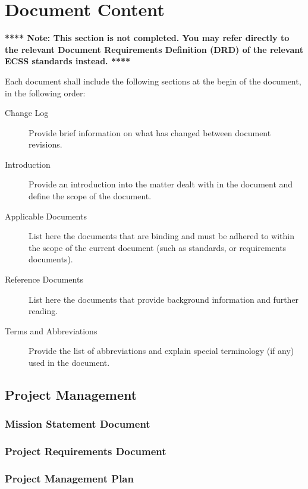 \chapter{Document Content}

\textbf{
****
Note: This section is not completed. You may refer directly to the relevant Document Requirements Definition (DRD) of the relevant ECSS standards instead.
****}


Each document shall include the following sections at the begin of the document, in the following order:

\begin{description}
\item[Change Log]
Provide brief information on what has changed between document revisions.
\item[Introduction]
Provide an introduction into the matter dealt with in the document and define the scope of the document.
\item[Applicable Documents]
List here the documents that are binding and must be adhered to within the scope of the current document (such as standards, or requirements documents).
\item[Reference Documents]
List here the documents that provide background information and further reading.
\item[Terms and Abbreviations]
Provide the list of abbreviations and explain special terminology (if any) used in the document. 
\end{description}


\section{Project Management}


\subsection{Mission Statement Document}
\label{sec:Mission Statement Document}


\subsection{Project Requirements Document}
\label{sec:Project Requirements Document}


\subsection{Project Management Plan}
\label{sec:Project Management Plan}


